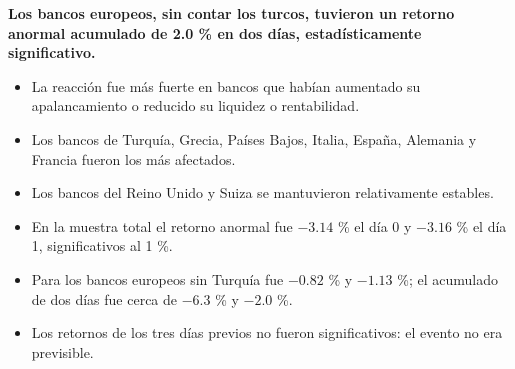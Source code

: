 \documentclass{article}
\newcommand{\bodysize}{\fontsize{30}{39.6}\selectfont}
\newcommand{\cardtitlesize}{\fontsize{35.4}{42.5}\selectfont}
\newcommand{\smallsize}{\fontsize{24.6}{32.0}\selectfont}
\newcommand{\cardtitle}[2][navy]{{\color{#1}\cardtitlesize\bfseries\textls[110]{\MakeUppercase{#2}}}\par\vspace{7mm}}
\begin{document}
\vfill
\hspace*{34mm}\begin{minipage}{773mm}
\begin{tcolorbox}[card=teal]\cardtitle[teal]{Resultados}
\begin{tcolorbox}[enhanced, sharp corners, colback=tealSoft, boxrule=0pt, left=14mm, right=14mm, top=10mm, bottom=11mm,
  borderline west={4mm}{0mm}{teal}, fontupper=\bodysize\color{ink}\raggedright]
{\color{teal}\smallsize\bfseries{}}\par\vspace{4mm}
{\bfseries Los bancos europeos, sin contar los turcos, tuvieron un retorno anormal acumulado de 2.0 \% en dos días, estadísticamente significativo.}
\end{tcolorbox}
\vspace{11mm}
\begin{minipage}[t]{0.48\linewidth}
\begin{itemize}
\item La reacción fue más fuerte en bancos que habían aumentado su apalancamiento o reducido su liquidez o rentabilidad.
\item Los bancos de Turquía, Grecia, Países Bajos, Italia, España, Alemania y Francia fueron los más afectados.
\item Los bancos del Reino Unido y Suiza se mantuvieron relativamente estables.
\end{itemize}
\end{minipage}\hfill
\begin{minipage}[t]{0.48\linewidth}
\begin{itemize}
\item En la muestra total el retorno anormal fue $-3.14$ \% el día 0 y $-3.16$ \% el día 1, significativos al 1 \%.
\item Para los bancos europeos sin Turquía fue $-0.82$ \% y $-1.13$ \%; el acumulado de dos días fue cerca de $-6.3$ \% y $-2.0$ \%.
\item Los retornos de los tres días previos no fueron significativos: el evento no era previsible.
\end{itemize}
\end{minipage}
\end{tcolorbox}
\end{minipage}
\end{document}
